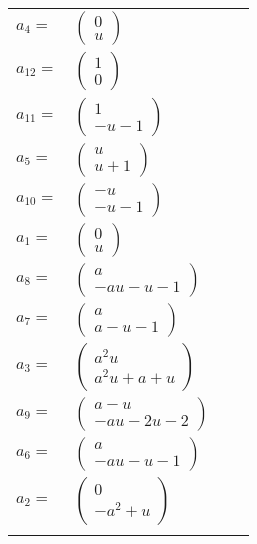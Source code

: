 \documentclass[1p]{elsarticle_modified}
\theoremstyle{definition}
\begin{document}
\begin{tabular}{m{7pt} m{180pt} m{7pt} m{180pt} }
\flushright $a_{4}=$&$\begin{pmatrix}0\\u\end{pmatrix}$ \\
\flushright $a_{12}=$&$\begin{pmatrix}1\\0\end{pmatrix}$ \\
\flushright $a_{11}=$&$\begin{pmatrix}1\\- u-1\end{pmatrix}$ \\
\flushright $a_{5}=$&$\begin{pmatrix}u\\u+1\end{pmatrix}$ \\
\flushright $a_{10}=$&$\begin{pmatrix}- u\\- u-1\end{pmatrix}$ \\
\flushright $a_{1}=$&$\begin{pmatrix}0\\u\end{pmatrix}$ \\
\flushright $a_{8}=$&$\begin{pmatrix}a\\- a u- u-1\end{pmatrix}$ \\
\flushright $a_{7}=$&$\begin{pmatrix}a\\a- u-1\end{pmatrix}$ \\
\flushright $a_{3}=$&$\begin{pmatrix}a^2 u\\a^2 u+a+u\end{pmatrix}$ \\
\flushright $a_{9}=$&$\begin{pmatrix}a- u\\- a u-2 u-2\end{pmatrix}$ \\
\flushright $a_{6}=$&$\begin{pmatrix}a\\- a u- u-1\end{pmatrix}$ \\
\flushright $a_{2}=$&$\begin{pmatrix}0\\- a^2+u\end{pmatrix}$\\&\end{tabular}
\end{document}
